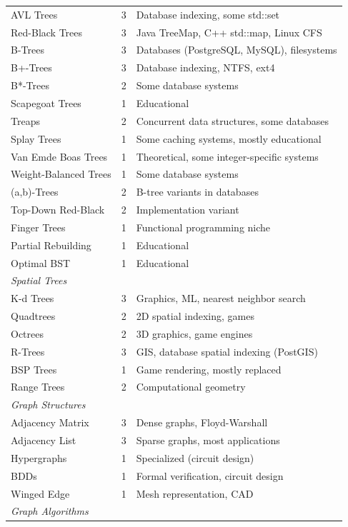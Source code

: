 \begin{center}
\begin{tabular}{lcl}
AVL Trees & 3 & Database indexing, some std::set \\
Red-Black Trees & 3 & Java TreeMap, C++ std::map, Linux CFS \\
B-Trees & 3 & Databases (PostgreSQL, MySQL), filesystems \\
B+-Trees & 3 & Database indexing, NTFS, ext4 \\
B*-Trees & 2 & Some database systems \\
Scapegoat Trees & 1 & Educational \\
Treaps & 2 & Concurrent data structures, some databases \\
Splay Trees & 1 & Some caching systems, mostly educational \\
Van Emde Boas Trees & 1 & Theoretical, some integer-specific systems \\
Weight-Balanced Trees & 1 & Some database systems \\
(a,b)-Trees & 2 & B-tree variants in databases \\
Top-Down Red-Black & 2 & Implementation variant \\
Finger Trees & 1 & Functional programming niche \\
Partial Rebuilding & 1 & Educational \\
Optimal BST & 1 & Educational \\
\midrule
\multicolumn{3}{l}{\textit{Spatial Trees}} \\
\midrule
K-d Trees & 3 & Graphics, ML, nearest neighbor search \\
Quadtrees & 2 & 2D spatial indexing, games \\
Octrees & 2 & 3D graphics, game engines \\
R-Trees & 3 & GIS, database spatial indexing (PostGIS) \\
BSP Trees & 1 & Game rendering, mostly replaced \\
Range Trees & 2 & Computational geometry \\
\midrule
\multicolumn{3}{l}{\textit{Graph Structures}} \\
\midrule
Adjacency Matrix & 3 & Dense graphs, Floyd-Warshall \\
Adjacency List & 3 & Sparse graphs, most applications \\
Hypergraphs & 1 & Specialized (circuit design) \\
BDDs & 1 & Formal verification, circuit design \\
Winged Edge & 1 & Mesh representation, CAD \\
\midrule
\multicolumn{3}{l}{\textit{Graph Algorithms}} \\

\end{tabular}
\end{center}
